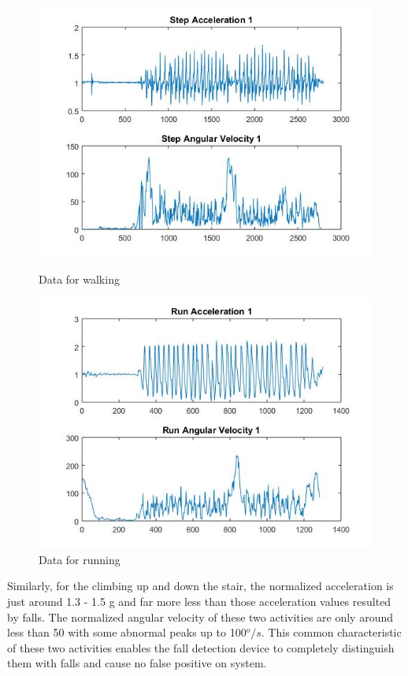 \documentclass[letterpaper,12pt,titlepage,oneside,final]{book}
\begin{document}
\begin{figure}[h!]
	\centering
	\hspace{-1cm}
	\begin{minipage}[b]{0.5\textwidth}
		\centering
		\includegraphics[scale=0.42]{step_1}
		\caption{Data for walking}
	\end{minipage}%
	\hfill
	\begin{minipage}[b]{0.5\textwidth}
		\centering
		\includegraphics[scale=0.42]{run_1}
		\caption{Data for running}
	\end{minipage}	
\end{figure}
\clearpage
Similarly, for the climbing up and down the stair, the normalized acceleration is just around 1.3 - 1.5 g and far more less than those acceleration values resulted by falls. The normalized angular velocity of these two activities are only around less than 50 with some abnormal peaks up to 100$^{o}/s$. This common characteristic of these two activities enables the fall detection device to completely distinguish them with falls and cause no false positive on system.  
\end{document}
